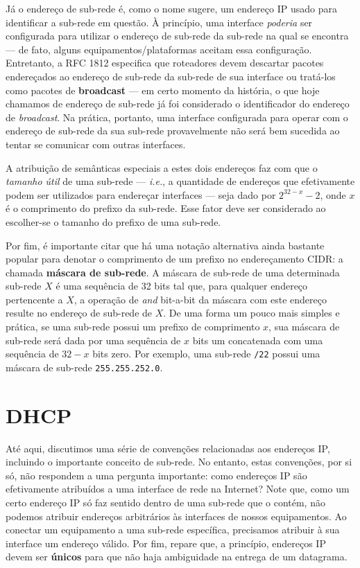 \documentclass{article}
\begin{document}
Já o endereço de sub-rede é, como o nome sugere, um endereço IP usado para identificar a sub-rede em questão. À princípio, uma interface \textit{poderia} ser configurada para utilizar o endereço de sub-rede da sub-rede na qual se encontra --- de fato, alguns equipamentos/plataformas aceitam essa configuração. Entretanto, a RFC 1812 especifica que roteadores devem descartar pacotes endereçados ao endereço de sub-rede da sub-rede de sua interface ou tratá-los como pacotes de \textbf{broadcast} --- em certo momento da história, o que hoje chamamos de endereço de sub-rede já foi considerado o identificador do endereço de \textit{broadcast}. Na prática, portanto, uma interface configurada para operar com o endereço de sub-rede da sua sub-rede provavelmente não será bem sucedida ao tentar se comunicar com outras interfaces.

A atribuição de semânticas especiais a estes dois endereços faz com que o \textit{tamanho útil} de uma sub-rede --- \textit{i.e.}, a quantidade de endereços que efetivamente podem ser utilizados para endereçar interfaces --- seja dado por $2^{32-x} - 2$, onde $x$ é o comprimento do prefixo da sub-rede. Esse fator deve ser considerado ao escolher-se o tamanho do prefixo de uma sub-rede.

Por fim, é importante citar que há uma notação alternativa ainda bastante popular para denotar o comprimento de um prefixo no endereçamento CIDR: a chamada \textbf{máscara de sub-rede}. A máscara de sub-rede de uma determinada sub-rede $X$ é uma sequência de 32 bits tal que, para qualquer endereço pertencente a $X$, a operação de \textit{and} bit-a-bit da máscara com este endereço resulte no endereço de sub-rede de $X$. De uma forma um pouco mais simples e prática, se uma sub-rede possui um prefixo de comprimento $x$, sua máscara de sub-rede será dada por uma sequência de $x$ bits um concatenada com uma sequência de $32-x$ bits zero. Por exemplo, uma sub-rede \texttt{/22} possui uma máscara de sub-rede \texttt{255.255.252.0}.

\section{DHCP}

Até aqui, discutimos uma série de convenções relacionadas aos endereços IP, incluindo o importante conceito de sub-rede. No entanto, estas convenções, por si só, não respondem a uma pergunta importante: como endereços IP são efetivamente atribuídos a uma interface de rede na Internet? Note que, como um certo endereço IP só faz sentido dentro de uma sub-rede que o contém, não podemos atribuir endereços arbitrários às interfaces de nossos equipamentos. Ao conectar um equipamento a uma sub-rede específica, precisamos atribuir à sua interface um endereço válido. Por fim, repare que, a princípio, endereços IP devem ser \textbf{únicos} para que não haja ambiguidade na entrega de um datagrama.
\end{document}
